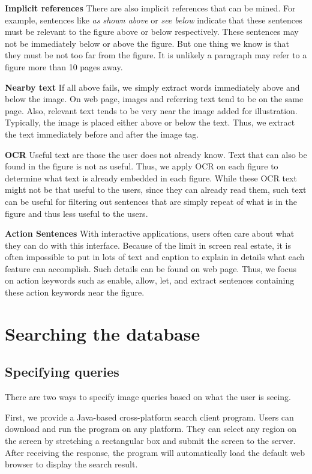 \textbf{Implicit references} There are also implicit references
that can be mined. For example, sentences like \emph{as shown
above} or \emph{see below} indicate that these sentences must be
relevant to the figure above or below respectively. These
sentences may not be immediately below or above the figure. But
one thing we know is that they must be not too far from the
figure. It is unlikely a paragraph may refer to a figure more than
10 pages away.

\textbf{Nearby text} If all above fails, we simply extract words
immediately above and below the image. On web page, images and
referring text tend to be on the same page. Also, relevant text
tends to be very near the image added for illustration. Typically,
the image is placed either above or below the text. Thus, we
extract the text immediately before and after the image tag.

\textbf{OCR} Useful text are those the user does not already know.
Text that can also be found in the figure is not as useful. Thus,
we apply OCR on each figure to determine what text is already
embedded in each figure. While these OCR text might not be that
useful to the users, since they can already read them, such text
can be useful for filtering out sentences that are simply repeat
of what is in the figure and thus less useful to the users.

\textbf{Action Sentences} With interactive applications, users
often care about what they can do with this interface. Because of
the limit in screen real estate, it is often impossible to put in
lots of text and caption to explain in details what each feature
can accomplish. Such details can be found on web page. Thus, we
focus on action keywords such as enable, allow, let, and extract
sentences containing these action keywords near the figure.




\section{Searching the database}

\subsection{Specifying queries}

There are two ways to specify image queries based on what the user
is seeing.

First, we provide a Java-based cross-platform search client
program. Users can download and run the program on any platform.
They can select any region on the screen by stretching a
rectangular box and submit the screen to the server. After
receiving the response, the program will automatically load the
default web browser to display the search result.

